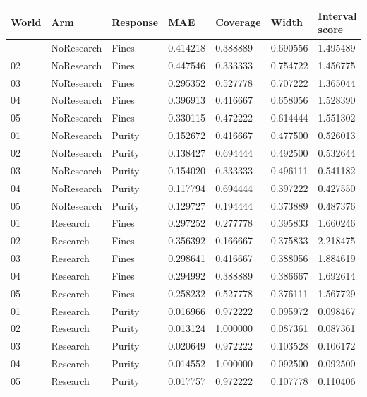 \documentclass[10pt,a4paper]{article}
\begin{document}
{\def\LTcaptype{table} %
\small\begin{longtable}[]{@{}lllllll@{}}
\toprule\noalign{}
World & Arm & Response & MAE & Coverage & Width & Interval score \\
\midrule\noalign{}
\endhead
\bottomrule\noalign{}
\endlastfoot
01 & NoResearch & Fines & 0.414218 & 0.388889 & 0.690556 & 1.495489 \\
02 & NoResearch & Fines & 0.447546 & 0.333333 & 0.754722 & 1.456775 \\
03 & NoResearch & Fines & 0.295352 & 0.527778 & 0.707222 & 1.365044 \\
04 & NoResearch & Fines & 0.396913 & 0.416667 & 0.658056 & 1.528390 \\
05 & NoResearch & Fines & 0.330115 & 0.472222 & 0.614444 & 1.551302 \\
01 & NoResearch & Purity & 0.152672 & 0.416667 & 0.477500 & 0.526013 \\
02 & NoResearch & Purity & 0.138427 & 0.694444 & 0.492500 & 0.532644 \\
03 & NoResearch & Purity & 0.154020 & 0.333333 & 0.496111 & 0.541182 \\
04 & NoResearch & Purity & 0.117794 & 0.694444 & 0.397222 & 0.427550 \\
05 & NoResearch & Purity & 0.129727 & 0.194444 & 0.373889 & 0.487376 \\
01 & Research & Fines & 0.297252 & 0.277778 & 0.395833 & 1.660246 \\
02 & Research & Fines & 0.356392 & 0.166667 & 0.375833 & 2.218475 \\
03 & Research & Fines & 0.298641 & 0.416667 & 0.388056 & 1.884619 \\
04 & Research & Fines & 0.294992 & 0.388889 & 0.386667 & 1.692614 \\
05 & Research & Fines & 0.258232 & 0.527778 & 0.376111 & 1.567729 \\
01 & Research & Purity & 0.016966 & 0.972222 & 0.095972 & 0.098467 \\
02 & Research & Purity & 0.013124 & 1.000000 & 0.087361 & 0.087361 \\
03 & Research & Purity & 0.020649 & 0.972222 & 0.103528 & 0.106172 \\
04 & Research & Purity & 0.014552 & 1.000000 & 0.092500 & 0.092500 \\
05 & Research & Purity & 0.017757 & 0.972222 & 0.107778 & 0.110406 \\
\end{longtable}\normalsize
}
\end{document}
